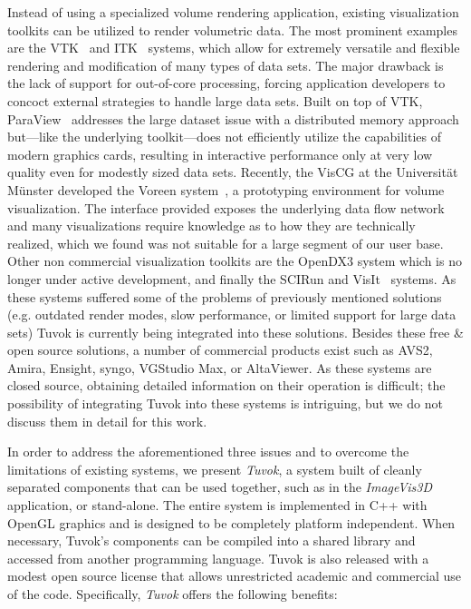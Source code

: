 Instead of using a specialized volume rendering application,
existing visualization toolkits can be utilized to render
volumetric data. The most prominent examples are the
VTK~\cite{Schroeder:2006:VTK} and ITK~\cite{Yoo:2002:ITK} systems,
which allow for extremely versatile and flexible rendering and
modification of many types of data sets. The major drawback is the lack
of support for out-of-core processing, forcing application developers
to concoct external strategies to handle
large data sets. Built on top of VTK,
ParaView~\cite{Ahrens:2005:ParaView} addresses the large dataset
issue with a distributed memory approach but---like the underlying
toolkit---does not efficiently utilize the capabilities of modern
graphics cards, resulting in interactive performance only at very low
quality even for modestly sized data sets. Recently, the VisCG at the
Universit\"at M\"unster developed the Voreen
system~\cite{Voreen:2009}, a prototyping environment for volume
visualization.  The interface provided exposes the underlying data
flow network and many visualizations require knowledge as to how
they are technically realized, which we found was not suitable for a
large segment of our user base. Other non commercial visualization
toolkits are the OpenDX3 \todo{[IBM06]} system which is no longer under active
development, and
finally the SCIRun \todo{[Ins09]} and VisIt~\cite{Childs:2005:Contracts,
Childs:2012:VisIt} systems. As these systems suffered some of the
problems of previously mentioned solutions (e.g. outdated render modes,
slow performance, or limited support for large data sets) Tuvok is
currently being integrated into these solutions. Besides these free
\& open source solutions, a number of commercial products exist such
as AVS2, Amira, Ensight, syngo, VGStudio Max, or AltaViewer. As these
systems are closed source, obtaining detailed information on their
operation is difficult; the possibility of integrating Tuvok into these
systems is intriguing, but we do not discuss them in detail for this
work.

In order to address the aforementioned three issues and to overcome the
limitations of existing systems, we present \textit{Tuvok}, a system
built of cleanly separated components that can
be used together, such as in the \textit{ImageVis3D} application,
or stand-alone. The entire system is implemented in C++ with OpenGL
graphics and is designed to be completely platform independent. When
necessary, Tuvok's components can be compiled into a shared library
and accessed from another programming language. Tuvok is also released
with a modest open source license that allows unrestricted academic and
commercial use of the code. Specifically,
\textit{Tuvok} offers the following benefits:


